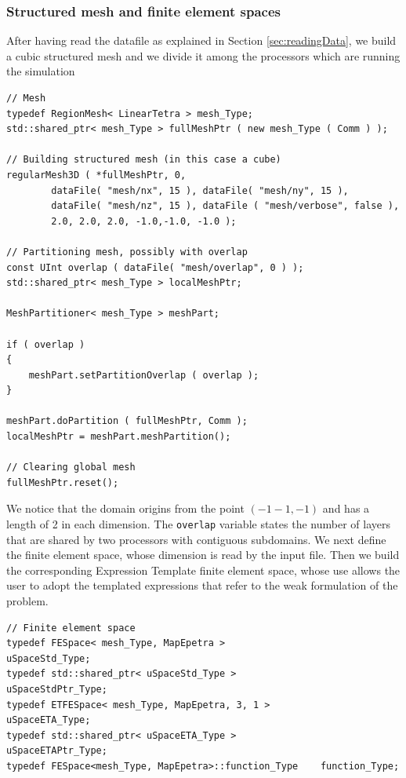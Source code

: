 \begin{itemize}
\subsubsection*{Structured mesh and finite element spaces}
After having read the datafile as explained in Section \ref{sec:readingData}, we build a cubic structured mesh and we divide it among the processors which are running the simulation

\begin{lstlisting}
// Mesh
typedef RegionMesh< LinearTetra > mesh_Type;
std::shared_ptr< mesh_Type > fullMeshPtr ( new mesh_Type ( Comm ) );
 
// Building structured mesh (in this case a cube)
regularMesh3D ( *fullMeshPtr, 0,
        dataFile( "mesh/nx", 15 ), dataFile( "mesh/ny", 15 ), 
        dataFile( "mesh/nz", 15 ), dataFile ( "mesh/verbose", false ),
        2.0, 2.0, 2.0, -1.0,-1.0, -1.0 );

// Partitioning mesh, possibly with overlap
const UInt overlap ( dataFile( "mesh/overlap", 0 ) );
std::shared_ptr< mesh_Type > localMeshPtr;

MeshPartitioner< mesh_Type > meshPart;

if ( overlap )
{
    meshPart.setPartitionOverlap ( overlap );
}
   
meshPart.doPartition ( fullMeshPtr, Comm );
localMeshPtr = meshPart.meshPartition();

// Clearing global mesh
fullMeshPtr.reset();
\end{lstlisting}    
We notice that the domain origins from the point $ (-1 -1, -1) $ and has a length of 2 in each dimension. The \verb!overlap! variable states the number of layers that are shared by two processors with contiguous subdomains.
\newline \noindent
We next define the finite element space, whose dimension is read by the input file. Then we build the corresponding Expression Template finite element space, whose use allows the user to adopt the templated expressions that refer to the weak formulation of the problem.
\begin{lstlisting}
// Finite element space
typedef FESpace< mesh_Type, MapEpetra >                 uSpaceStd_Type;
typedef std::shared_ptr< uSpaceStd_Type >             uSpaceStdPtr_Type;
typedef ETFESpace< mesh_Type, MapEpetra, 3, 1 >         uSpaceETA_Type;
typedef std::shared_ptr< uSpaceETA_Type >             uSpaceETAPtr_Type;
typedef FESpace<mesh_Type, MapEpetra>::function_Type    function_Type;


\end{lstlisting}
\end{itemize}
